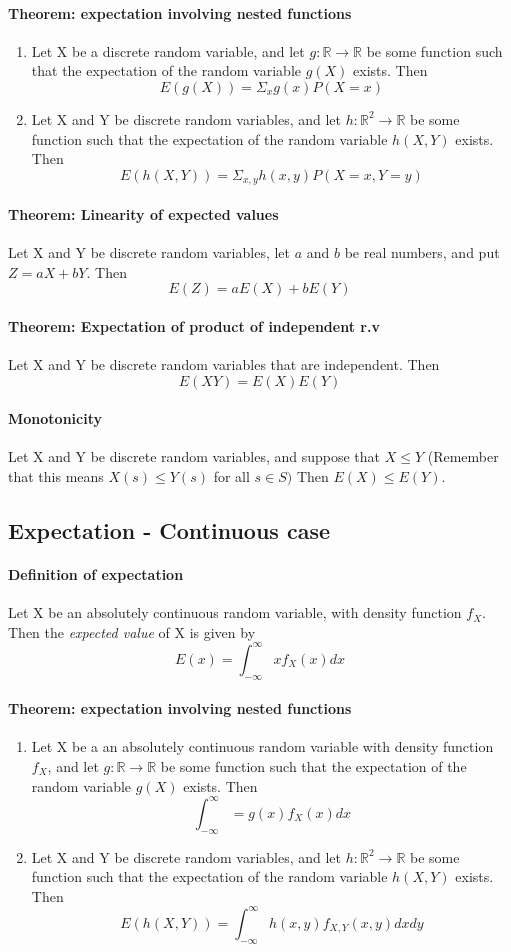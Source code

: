 \documentclass[11pt]{article}
\newcommand{\ti}[1]{\textit{#1}}
\newcommand{\mb}[1]{\mathbb{#1}}
\begin{document}
\paragraph{Theorem: expectation involving nested functions} 
\begin{enumerate}
\item Let X be a discrete random variable, and let $g: \mb{R} \rightarrow \mb{R}$ be some function such that the expectation of the random variable $g(X)$ exists. Then $$E(g(X)) = \Sigma_x g(x)P(X=x)$$
\item Let X and Y be discrete random variables, and let $h: \mb{R}^2 \rightarrow \mb{R}$ be some function such that the expectation of the random variable $h(X,Y)$ exists. Then
$$E(h(X,Y)) = \Sigma_{x,y}h(x,y)P(X=x,Y=y)$$
\end{enumerate}
\paragraph{Theorem: Linearity of expected values} Let X and Y be discrete random variables, let $a$ and $b$ be real numbers, and put $Z = aX + bY$. Then $$E(Z) = aE(X) + bE(Y)$$
\paragraph{Theorem: Expectation of product of independent r.v}Let X and Y be discrete random variables that are independent. Then $$E(XY) = E(X)E(Y)$$
\paragraph{Monotonicity} Let X and Y be discrete random variables, and suppose that $X \leq Y$ (Remember that this means $X(s) \leq Y(s)$ for all $s\in S)$ Then $E(X) \leq E(Y)$.
\subsection{Expectation - Continuous case}
\paragraph{Definition of expectation} Let X be an absolutely continuous random variable, with density function $f_X$. Then the \ti{expected value} of X is given by
$$ E(x) = \int_{-\infty}^{\infty}xf_X(x)dx$$
\paragraph{Theorem: expectation involving nested functions} 
\begin{enumerate}
\item Let X be a an absolutely continuous random variable with density function $f_X$, and let $g: \mb{R} \rightarrow \mb{R}$ be some function such that the expectation of the random variable $g(X)$ exists. Then $$\int_{-\infty}^{\infty} =  g(x)f_X(x)dx$$
\item Let X and Y be discrete random variables, and let $h: \mb{R}^2 \rightarrow \mb{R}$ be some function such that the expectation of the random variable $h(X,Y)$ exists. Then
 $$E(h(X,Y)) = \int_{-\infty}^{\infty}h(x,y)f_{X,Y}(x,y)dxdy$$
 \end{enumerate}
\end{document}
